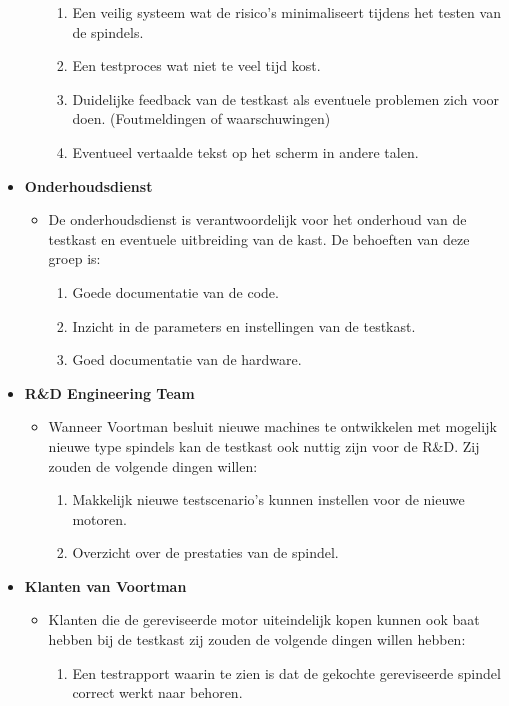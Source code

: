 \begin{itemize}
\begin{itemize}
\begin{enumerate}
			\item Een veilig systeem wat de risico’s minimaliseert tijdens het testen van de spindels.
			
			\item Een testproces wat niet te veel tijd kost.
			
			\item Duidelijke feedback van de testkast als eventuele problemen zich voor doen. (Foutmeldingen of waarschuwingen)
			
			\item Eventueel vertaalde tekst op het scherm in andere talen.
		\end{enumerate}
	\end{itemize}
	
	\item \textbf{Onderhoudsdienst}
	\begin{itemize}
		\item De onderhoudsdienst is verantwoordelijk voor het onderhoud van de testkast en eventuele uitbreiding van de kast. De behoeften van deze groep is:
		\begin{enumerate}
			\item Goede documentatie van de code.
			
			\item Inzicht in de parameters en instellingen van de testkast.
			
			\item Goed documentatie van de hardware.
		\end{enumerate}
	\end{itemize}
	
	\item \textbf{R\&D Engineering Team}
	\begin{itemize}
		\item Wanneer Voortman besluit nieuwe machines te ontwikkelen met mogelijk nieuwe type spindels kan de testkast ook nuttig zijn voor de R\&D. Zij zouden de volgende dingen willen:
		\begin{enumerate}
			\item Makkelijk nieuwe testscenario’s kunnen instellen voor de nieuwe motoren.
			
			\item Overzicht over de prestaties van de spindel.
		\end{enumerate}
	\end{itemize}
	
	\item \textbf{Klanten van Voortman}
	\begin{itemize}
		\item Klanten die de gereviseerde motor uiteindelijk kopen kunnen ook baat hebben bij de testkast zij zouden de volgende dingen willen hebben:
		\begin{enumerate}
			\item Een testrapport waarin te zien is dat de gekochte gereviseerde spindel correct werkt naar behoren.
		\end{enumerate}
	\end{itemize}
\end{itemize}

